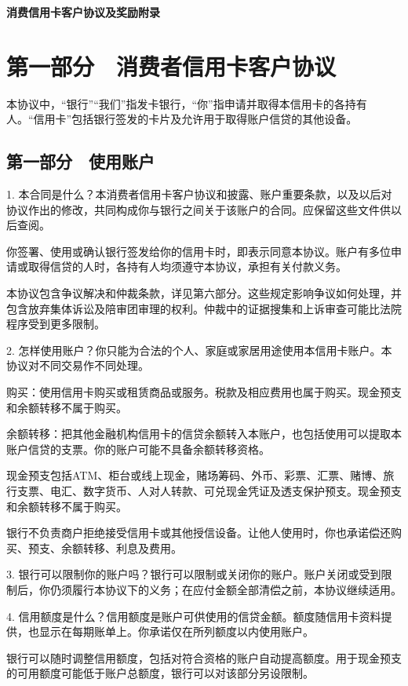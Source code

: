 \documentclass[UTF8,fontset=none,11pt,a4paper]{ctexart}
\begin{document}
{\noindent\LARGE\bfseries 消费信用卡客户协议及奖励附录\par}
\vspace{10pt}
\section*{第一部分　消费者信用卡客户协议}
本协议中，“银行”“我们”指发卡银行，“你”指申请并取得本信用卡的各持有人。“信用卡”包括银行签发的卡片及允许用于取得账户信贷的其他设备。


\subsection*{第一部分　使用账户}
1. 本合同是什么？本消费者信用卡客户协议和披露、账户重要条款，以及以后对协议作出的修改，共同构成你与银行之间关于该账户的合同。应保留这些文件供以后查阅。


你签署、使用或确认银行签发给你的信用卡时，即表示同意本协议。账户有多位申请或取得信贷的人时，各持有人均须遵守本协议，承担有关付款义务。


本协议包含争议解决和仲裁条款，详见第六部分。这些规定影响争议如何处理，并包含放弃集体诉讼及陪审团审理的权利。仲裁中的证据搜集和上诉审查可能比法院程序受到更多限制。


2. 怎样使用账户？你只能为合法的个人、家庭或家居用途使用本信用卡账户。本协议对不同交易作不同处理。


购买：使用信用卡购买或租赁商品或服务。税款及相应费用也属于购买。现金预支和余额转移不属于购买。


余额转移：把其他金融机构信用卡的信贷余额转入本账户，也包括使用可以提取本账户信贷的支票。你的账户可能不具备余额转移资格。


现金预支包括ATM、柜台或线上现金，赌场筹码、外币、彩票、汇票、赌博、旅行支票、电汇、数字货币、人对人转款、可兑现金凭证及透支保护预支。现金预支和余额转移不属于购买。


银行不负责商户拒绝接受信用卡或其他授信设备。让他人使用时，你也承诺偿还购买、预支、余额转移、利息及费用。


3. 银行可以限制你的账户吗？银行可以限制或关闭你的账户。账户关闭或受到限制后，你仍须履行本协议下的义务；在应付金额全部清偿之前，本协议继续适用。


4. 信用额度是什么？信用额度是账户可供使用的信贷金额。额度随信用卡资料提供，也显示在每期账单上。你承诺仅在所列额度以内使用账户。


银行可以随时调整信用额度，包括对符合资格的账户自动提高额度。用于现金预支的可用额度可能低于账户总额度，银行可以对该部分另设限制。
\end{document}
